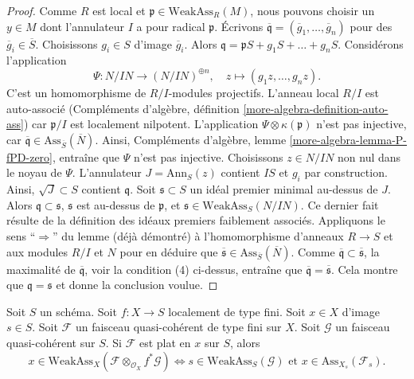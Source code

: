 \begin{proof}
\medskip\noindent
Comme $R$ est local et $\mathfrak p \in \text{WeakAss}_R(M)$,
nous pouvons choisir un $y \in M$ dont l'annulateur $I$ a pour radical
$\mathfrak p$.
Écrivons $\overline{\mathfrak q} = (\overline{g}_1, \ldots, \overline{g}_n)$
pour des $\overline{g}_i \in \overline{S}$. Choisissons $g_i \in S$
d'image $\overline{g}_i$.
Alors $\mathfrak q = \mathfrak pS + g_1S + \ldots + g_nS$.
Considérons l'application
$$
\Psi : N/IN \longrightarrow (N/IN)^{\oplus n}, \quad
z \longmapsto (g_1z, \ldots, g_nz).
$$
C'est un homomorphisme de $R/I$-modules projectifs.
L'anneau local $R/I$ est auto-associé
(Compléments d'algèbre, définition \ref{more-algebra-definition-auto-ass})
car $\mathfrak p/I$ est localement nilpotent.
L'application $\Psi \otimes \kappa(\mathfrak p)$ n'est pas injective, car
$\overline{\mathfrak q} \in \text{Ass}_{\overline{S}}(\overline{N})$.
Ainsi, Compléments d'algèbre, lemme \ref{more-algebra-lemma-P-fPD-zero},
entraîne que $\Psi$ n'est pas injective. Choisissons $z \in N/IN$
non nul dans le noyau de $\Psi$. L'annulateur $J = \text{Ann}_S(z)$
contient $IS$ et $g_i$ par construction. Ainsi,
$\sqrt{J} \subset S$ contient $\mathfrak q$.
Soit $\mathfrak s \subset S$ un idéal premier minimal au-dessus de $J$.
Alors $\mathfrak q \subset \mathfrak s$,
$\mathfrak s$ est au-dessus de $\mathfrak p$, et
$\mathfrak s \in \text{WeakAss}_S(N/IN)$.
Ce dernier fait résulte de la définition des idéaux premiers faiblement associés.
Appliquons le sens ``$\Rightarrow$'' du lemme (déjà démontré)
à l'homomorphisme d'anneaux $R \to S$ et aux modules $R/I$ et $N$
pour en déduire que
$\overline{\mathfrak s} \in \text{Ass}_{\overline{S}}(\overline{N})$.
Comme $\overline{\mathfrak q} \subset \overline{\mathfrak s}$,
la maximalité de $\overline{\mathfrak q}$, voir la condition (4) ci-dessus,
entraîne que $\overline{\mathfrak q} = \overline{\mathfrak s}$.
Cela montre que $\mathfrak q = \mathfrak s$ et donne
la conclusion voulue.
\end{proof}

\begin{lemma}
\label{lemma-bourbaki-finite-type-general-base-at-point}
Soit $S$ un schéma.
Soit $f : X \to S$ localement de type fini.
Soit $x \in X$ d'image $s \in S$.
Soit $\mathcal{F}$ un faisceau quasi-cohérent de type fini sur $X$.
Soit $\mathcal{G}$ un faisceau quasi-cohérent sur $S$.
Si $\mathcal{F}$ est plat en $x$ sur $S$, alors
$$
x \in \text{WeakAss}_X(\mathcal{F} \otimes_{\mathcal{O}_X} f^*\mathcal{G})
\Leftrightarrow
s \in \text{WeakAss}_S(\mathcal{G})
\text{ et }
x \in \text{Ass}_{X_s}(\mathcal{F}_s).
$$
\end{lemma}

